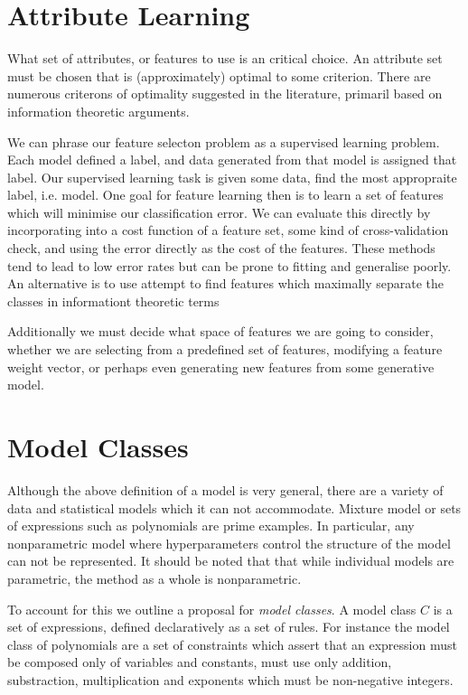 \section{Attribute Learning}
What set of attributes, or features to use is an critical choice.
An attribute set must be chosen that is (approximately) optimal to some criterion.
There are numerous criterons of optimality suggested in the literature, primaril based on information theoretic arguments.

We can phrase our feature selecton problem as a supervised learning problem.
Each model defined a label, and data generated from that model is assigned that label.
Our supervised learning task is given some data, find the most appropraite label, i.e. model.
One goal for feature learning then is to learn a set of features which will minimise our classification error.
We can evaluate this directly by incorporating into a cost function of a feature set, some kind of cross-validation check, and using the error directly as the cost of the features.
These methods tend to lead to low error rates but can be prone to fitting and generalise poorly.
An alternative is to use attempt to find features which maximally separate the classes in informationt theoretic terms

Additionally we must decide what space of features we are going to consider, whether we are selecting from a predefined set of features, modifying a feature weight vector, or perhaps even generating new features from some generative model.

\section{Model Classes}
Although the above definition of a model is very general, there are a variety of data and statistical models which it can not accommodate.
Mixture model or sets of expressions such as polynomials are prime examples.
In particular, any nonparametric model where hyperparameters control the structure of the model can not be represented.
It should be noted that that while individual models are parametric, the method as a whole is nonparametric.

To account for this we outline a proposal for \textit{model classes}. 
A model class $C$ is a set of expressions, defined declaratively as a set of rules.
For instance the model class of polynomials are a set of constraints which assert that an expression must be composed only of variables and constants, must use only addition, substraction, multiplication and exponents which must be non-negative integers.

